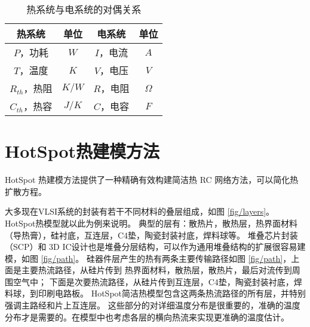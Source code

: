\begin{table}[H]
\centering
\caption{热系统与电系统的对偶关系}\label{tab:duality}{
 \begin{tabular}{|c|c||c|c|}
 \hline
 \hline
 热系统 &  单位 & 电系统 & 单位 \\
 \hline 
 \hline
 $P$，功耗         & $W$   & $I$，电流 & $A$  \\
 \hline
 $T$，温度         & $K$   & $V$，电压 & $V$ \\
 \hline
 $R_{th}$，热阻    & $K/W$ & $R$，电阻 & $\Omega$ \\
 \hline
 $C_{th}$，热容    & $J/K$ & $C$，电容 & $F$ \\
 \hline
 \hline
 \end{tabular}
 }
 \end{table}
\section{HotSpot热建模方法}\label{sec:hotspot}

HotSpot 热建模方法提供了一种精确有效构建简洁热 RC 网络方法，可以简化热扩散方程。

大多现在VLSI系统的封装有若干不同材料的叠层组成，如图 \ref{fig/layers}。
HotSpot热模型就以此为例来说明。
典型的层有：散热片，散热层，热界面材料（导热膏），硅衬底，互连层，C4垫，陶瓷封装衬底，焊料球等。
堆叠芯片封装（SCP）和 3D IC设计也是堆叠分层结构，可以作为通用堆叠结构的扩展很容易建模，如图 \ref{fig/path}。
硅器件层产生的热有两条主要传输路径如图 \ref{fig/path}，上面是主要热流路径，从硅片传到 热界面材料，散热层，散热片，最后对流传到周围空气中；
下面是次要热流路径，从硅片传到互连层，C4垫，陶瓷封装衬底，焊料球，到印刷电路板。
HotSpot简洁热模型包含这两条热流路径的所有层，并特别强调主路经和片上互连层。
这些部分的对详细温度分布是很重要的，准确的温度分布才是需要的。在模型中也考虑各层的横向热流来实现更准确的温度估计。




